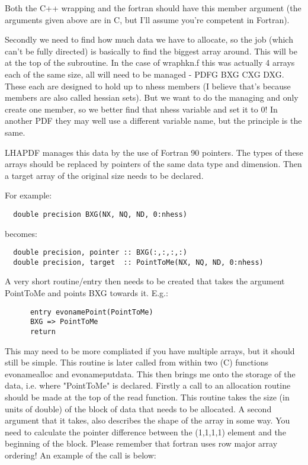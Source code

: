 Both the C++ wrapping and the fortran should have this member argument (the
arguments given above are in C, but I'll assume you're competent in 
Fortran).

Secondly we need to find how much data we have to allocate, so the job
(which can't be fully directed) is basically to find the biggest array
around. This will be at the top of the subroutine. In the case of wraphkn.f
this was actually 4 arrays each of the same size, all will need to be
managed - PDFG BXG CXG DXG. These each are designed to hold up to nhess
members (I believe that's because members are also called hessian sets).
But we want to do the managing and only create one member, so we better
find that nhess variable and set it to 0! In another PDF they may well use
a different variable name, but the principle is the same.

LHAPDF manages this data by the use of Fortran 90 pointers. The types of 
these arrays should be replaced by pointers of the same data type and
dimension. Then a target array of the original size needs to be declared.

For example:

\begin{verbatim}
  double precision BXG(NX, NQ, ND, 0:nhess)
\end{verbatim}

becomes:

\begin{verbatim}
  double precision, pointer :: BXG(:,:,:,:)
  double precision, target  :: PointToMe(NX, NQ, ND, 0:nhess)
\end{verbatim}

A very short routine/entry then needs to be created that takes the argument 
PointToMe and points BXG towards it. E.g.:

    \begin{verbatim}
      entry evonamePoint(PointToMe)
      BXG => PointToMe
      return
    \end{verbatim}

This may need to be more compliated if you have multiple arrays, but it
should still be simple. This routine is later called from within two (C) 
functions evonamealloc and evonameputdata. This then brings me onto the 
storage of the data, i.e. where "PointToMe" is declared. Firstly a call to 
an allocation routine should be made at the top of the read function. This 
routine takes the size (in units of double) of the block of data that needs 
to be allocated. A second argument that it takes, also describes the shape
of the array in some way. You need to calculate the pointer difference
between the (1,1,1,1) element and the beginning of the block. Please
remember that fortran uses row major array ordering! An example of the
call is below:

